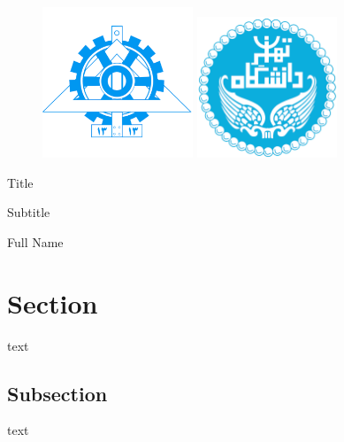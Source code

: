 \documentclass[12pt,onecolumn,a4paper]{article}
\begin{document}
\begin{titlepage}
\thispagestyle{empty}

\begin{figure}[ht]
\raggedright
\includegraphics[height = 4.5 cm ,width=4.5cm]{UT_logo_fanni_md.png}
\endminipage
{}
\raggedleft
\includegraphics[height = 4.2 cm ,width=4.2cm]{UT_logo_md.png}
\endminipage
\end{figure}

\begin{center}
\vspace{1.2cm}
\Huge
Title

\vspace{0.8cm}
\LARGE
Subtitle

\vspace{2.8cm}
\LARGE
Full Name


\vspace{2.8cm}
\large
\the\year{}
\end{center}

\newpage
\end{titlepage}



\section{Section}
text
\subsection{Subsection}
text
\end{document}

